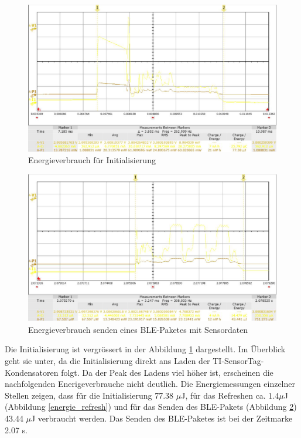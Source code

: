 \begin{figure}[ht]
  \includegraphics[width=1.0\textwidth]{3Vorgehen/imag/Init.png}
  \caption{Energieverbrauch für Initialisierung}
  \label{energie_init}
\end{figure}

\begin{figure}[ht]
  \includegraphics[width=1.0\textwidth]{3Vorgehen/imag/Senden.png}
  \caption{Energieverbrauch senden eines BLE-Paketes mit Sensordaten}
  \label{energie_senden}
\end{figure}

\clearpage
Die Initialisierung ist vergrössert in der Abbildung  \ref{energie_init} dargestellt. Im Überblick geht sie unter, da die Initialisierung direkt ans Laden der TI-SensorTag-Kondensatoren folgt. Da der Peak des Ladens viel höher ist, erscheinen die nachfolgenden Enerigeverbrauche nicht deutlich. Die Energiemessungen einzelner Stellen zeigen, dass für die Initialisierung 77.38 $\mu$J, für das Refreshen ca. $1.4\mu$J (Abbildung \ref{energie_refresh}) und für das Senden des BLE-Pakets (Abbildung \ref{energie_senden}) 43.44 $\mu$J verbraucht werden. Das Senden des BLE-Paketes ist bei der Zeitmarke 2.07 s.


